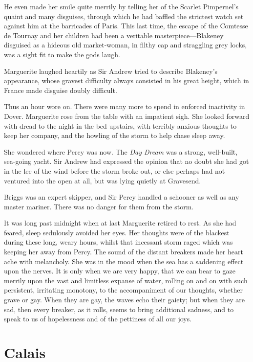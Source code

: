 \documentclass[paper=a5,BCOR=7mm,twoside,DIV=calc,12pt,usegeometry,chapterprefix,endperiod,headings=big]{scrbook}
\begin{document}
He even made her smile quite merrily by telling her of the Scarlet Pimpernel's quaint and many disguises, through which he had baffled the strictest watch set against him at the barricades of Paris. This last time, the escape of the Comtesse de Tournay and her children had been a veritable masterpiece---Blakeney disguised as a hideous old market-woman, in filthy cap and straggling grey locks, was a sight fit to make the gods laugh.

Marguerite laughed heartily as Sir Andrew tried to describe Blakeney's appearance, whose gravest difficulty always consisted in his great height, which in France made disguise doubly difficult.

Thus an hour wore on. There were many more to spend in enforced inactivity in Dover. Marguerite rose from the table with an impatient sigh. She looked forward with dread to the night in the bed upstairs, with terribly anxious thoughts to keep her company, and the howling of the storm to help chase sleep away.

She wondered where Percy was now. The \textit{Day Dream} was a strong, well-built, sea-going yacht. Sir Andrew had expressed the opinion that no doubt she had got in the lee of the wind before the storm broke out, or else perhaps had not ventured into the open at all, but was lying quietly at Gravesend.

Briggs was an expert skipper, and Sir Percy handled a schooner as well as any master mariner. There was no danger for them from the storm.

It was long past midnight when at last Marguerite retired to rest. As she had feared, sleep sedulously avoided her eyes. Her thoughts were of the blackest during these long, weary hours, whilst that incessant storm raged which was keeping her away from Percy. The sound of the distant breakers made her heart ache with melancholy. She was in the mood when the sea has a saddening effect upon the nerves. It is only when we are very happy, that we can bear to gaze merrily upon the vast and limitless expanse of water, rolling on and on with such persistent, irritating monotony, to the accompaniment of our thoughts, whether grave or gay. When they are gay, the waves echo their gaiety; but when they are sad, then every breaker, as it rolls, seems to bring additional sadness, and to speak to us of hopelessness and of the pettiness of all our joys.

\chapter{Calais}
\end{document}
